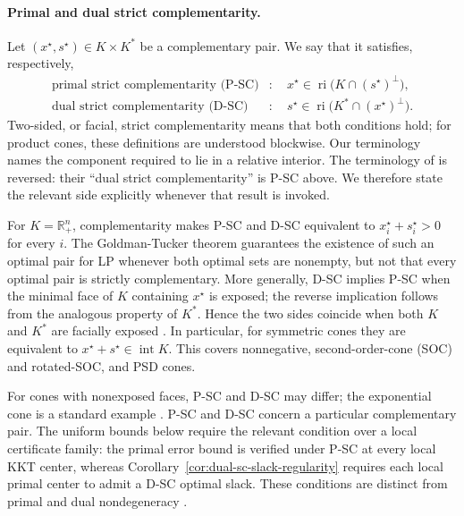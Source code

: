 \documentclass[letterpaper]{article} %
\theoremstyle{definition}
\theoremstyle{remark}
\begin{document}
\paragraph{Primal and dual strict complementarity.}
Let $(x^\star,s^\star)\in K\times K^*$ be a complementary pair.  We say
that it satisfies, respectively,
\[
\begin{aligned}
    \text{primal strict complementarity (P-SC)}
    &:\quad
    x^\star\in\operatorname{ri}\bigl(K\cap(s^\star)^\perp\bigr),\\
    \text{dual strict complementarity (D-SC)}
    &:\quad
    s^\star\in\operatorname{ri}\bigl(K^*\cap(x^\star)^\perp\bigr).
\end{aligned}
\]
Two-sided, or facial, strict complementarity means that both conditions
hold; for product cones, these definitions are understood blockwise.  Our
terminology names the component required to lie in a relative interior.
The terminology of \cite[Definition~2]{ding2023strict} is reversed: their
``dual strict complementarity'' is P-SC above.  We therefore state the
relevant side explicitly whenever that result is invoked.

For $K=\mathbb R_+^n$, complementarity makes P-SC and D-SC equivalent to
$x_i^\star+s_i^\star>0$ for every $i$.  The Goldman-Tucker theorem \cite{goldman1956theory} guarantees the
existence of such an optimal pair for LP whenever both optimal sets are
nonempty, but not that every optimal pair is strictly complementary. More generally, D-SC implies P-SC when the minimal face of $K$ containing
$x^\star$ is exposed; the reverse implication follows from the analogous
property of $K^*$.  Hence the two sides coincide when both $K$ and $K^*$ are
facially exposed \cite{chua2008invariance}.  In particular, for symmetric
cones they are equivalent to
$x^\star+s^\star\in\operatorname{int}K$.  This covers nonnegative,
second-order-cone (SOC) and rotated-SOC, and PSD cones.

For cones with nonexposed faces, P-SC and D-SC may differ; the exponential
cone is a standard example \cite{lindstrom2023exponential}. P-SC and D-SC concern a particular complementary pair.  The uniform bounds
below require the relevant condition over a local certificate family:
the primal error bound is verified under P-SC at every
local KKT center, whereas
Corollary~\ref{cor:dual-sc-slack-regularity} requires each local primal
center to admit a D-SC optimal slack.  These conditions are distinct from
primal and dual nondegeneracy \cite{alizadeh1997complementarity}.
\end{document}
